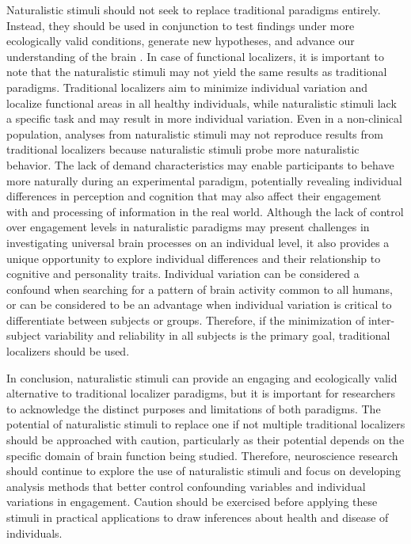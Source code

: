 %
Naturalistic stimuli should not seek to replace traditional paradigms entirely.
%
Instead, they should be used in conjunction to test findings under more
ecologically valid conditions, generate new hypotheses, and advance our
understanding of the brain \citep[cf.][]{jaaskelainen2021movies,
sonkusare2019naturalistic}.
%
In case of functional localizers, it is important to note that the naturalistic
stimuli may not yield the same results as traditional paradigms.
%
Traditional localizers aim to minimize individual variation and localize
functional areas in all healthy individuals, while naturalistic stimuli lack a
specific task and may result in more individual variation.
%
Even in a non-clinical population, analyses from naturalistic stimuli may not
reproduce results from traditional localizers because naturalistic stimuli probe
more naturalistic behavior.
%
The lack of demand characteristics may enable participants to behave more
naturally during an experimental paradigm, potentially revealing individual
differences in perception and cognition that may also affect their engagement
with and processing of information in the real world.
%
Although the lack of control over engagement levels in naturalistic paradigms
may present challenges in investigating universal brain processes on an
individual level, it also provides a unique opportunity to explore individual
differences and their relationship to cognitive and personality traits.
%
Individual variation can be considered a confound when searching for a pattern
of brain activity common to all humans, or can be considered to be an advantage
when individual variation is critical to differentiate between subjects or
groups.
%
Therefore, if the minimization of inter-subject variability and reliability in
all subjects is the primary goal, traditional localizers should be used.

%
In conclusion, naturalistic stimuli can provide an engaging and ecologically
valid alternative to traditional localizer paradigms, but it is important for
researchers to acknowledge the distinct purposes and limitations of both
paradigms.
%
The potential of naturalistic stimuli to replace one if not multiple traditional
localizers should be approached with caution, particularly as their potential
depends on the specific domain of brain function being studied.
%
Therefore, neuroscience research should continue to explore the use of
naturalistic stimuli and focus on developing analysis methods that better
control confounding variables and individual variations in engagement.
%
Caution should be exercised before applying these stimuli in practical
applications to draw inferences about health and disease of individuals.


